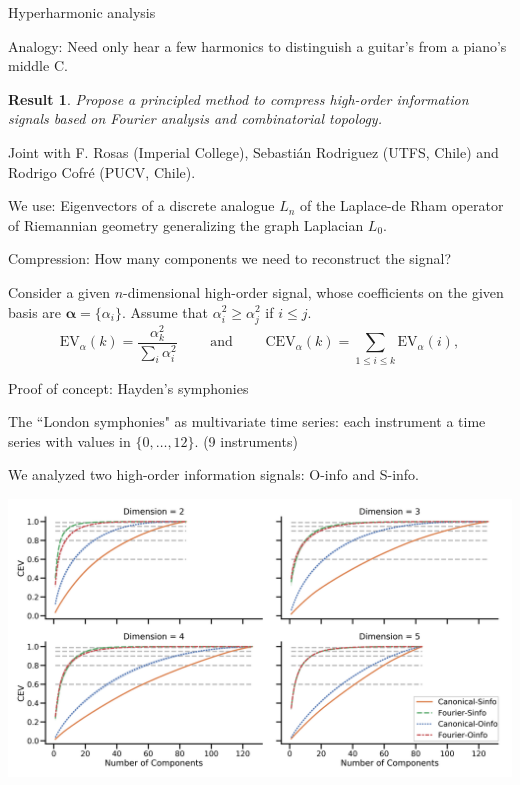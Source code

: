\documentclass[10pt,t]{beamer} %
\newtheorem{result}{Result}
\begin{document}
\begin{frame}{Hyperharmonic analysis}
	
	\vskip -5pt
	
	\textcolor{pblue}{Analogy:} Need only hear a few harmonics to distinguish a guitar's from a piano's middle C.
	
	\vskip 5pt
	\pause
	
	\begin{result}
		Propose a principled method to compress high-order information signals based on Fourier analysis and combinatorial topology.
	\end{result}

	Joint with F. Rosas (Imperial College), Sebasti\'an Rodriguez (UTFS, Chile) and Rodrigo Cofr\'e (PUCV, Chile). 
	
	\vskip 5pt
	\pause
	
	\textcolor{pblue}{We use:} Eigenvectors of a discrete analogue $L_n$ of the Laplace-de Rham operator of Riemannian geometry generalizing the graph Laplacian $L_0$.
	
	\vskip 5pt
	\pause
	
	\textcolor{pblue}{Compression:} How many components we need to reconstruct the signal?
	
	\vskip 5pt
	\pause
	
	Consider a given $n$-dimensional high-order signal,
	whose coefficients on the given basis are $\bm\alpha = \{\alpha_i\}$. Assume that $\alpha_i^2 \geq \alpha^2_j$ if $i \leq j$.
	\begin{equation*}
	\text{EV}_{\alpha}(k) = \frac{ \alpha_k^2}{{\displaystyle \sum_{i} \alpha_i^2}}
	\qquad \text{ and } \qquad
	\text{CEV}_{\alpha}(k) = \sum_{1\leq i \leq k} \text{EV}_{\alpha}(i),
	\end{equation*}
\end{frame}

\begin{frame}{Proof of concept: Hayden's symphonies}
	\vskip -5pt
	\pause
	
	The ``London symphonies" as multivariate time series: each instrument a time series with values in $\{0, \dots , 12\}$. (9 instruments)
	
	\vskip 5pt
	\pause
	
	We analyzed two high-order information signals: O-info and S-info.
	
	\vskip 3pt
	\pause
	
	\hspace*{-12pt}\includegraphics[scale=.092]{hyperharmonic}
\end{frame}
\end{document}
